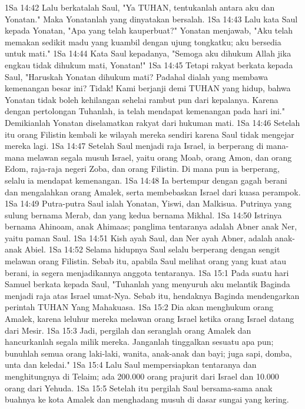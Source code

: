 1Sa 14:42  Lalu berkatalah Saul, "Ya TUHAN, tentukanlah antara aku dan Yonatan." Maka Yonatanlah yang dinyatakan bersalah.
1Sa 14:43  Lalu kata Saul kepada Yonatan, "Apa yang telah kauperbuat?" Yonatan menjawab, "Aku telah memakan sedikit madu yang kuambil dengan ujung tongkatku; aku bersedia untuk mati."
1Sa 14:44  Kata Saul kepadanya, "Semoga aku dihukum Allah jika engkau tidak dihukum mati, Yonatan!"
1Sa 14:45  Tetapi rakyat berkata kepada Saul, "Haruskah Yonatan dihukum mati? Padahal dialah yang membawa kemenangan besar ini? Tidak! Kami berjanji demi TUHAN yang hidup, bahwa Yonatan tidak boleh kehilangan sehelai rambut pun dari kepalanya. Karena dengan pertolongan Tuhanlah, ia telah mendapat kemenangan pada hari ini." Demikianlah Yonatan diselamatkan rakyat dari hukuman mati.
1Sa 14:46  Setelah itu orang Filistin kembali ke wilayah mereka sendiri karena Saul tidak mengejar mereka lagi.
1Sa 14:47  Setelah Saul menjadi raja Israel, ia berperang di mana-mana melawan segala musuh Israel, yaitu orang Moab, orang Amon, dan orang Edom, raja-raja negeri Zoba, dan orang Filistin. Di mana pun ia berperang, selalu ia mendapat kemenangan.
1Sa 14:48  Ia bertempur dengan gagah berani dan mengalahkan orang Amalek, serta membebaskan Israel dari kuasa perampok.
1Sa 14:49  Putra-putra Saul ialah Yonatan, Yiswi, dan Malkisua. Putrinya yang sulung bernama Merab, dan yang kedua bernama Mikhal.
1Sa 14:50  Istrinya bernama Ahinoam, anak Ahimaas; panglima tentaranya adalah Abner anak Ner, yaitu paman Saul.
1Sa 14:51  Kish ayah Saul, dan Ner ayah Abner, adalah anak-anak Abiel.
1Sa 14:52  Selama hidupnya Saul selalu berperang dengan sengit melawan orang Filistin. Sebab itu, apabila Saul melihat orang yang kuat atau berani, ia segera menjadikannya anggota tentaranya.
1Sa 15:1  Pada suatu hari Samuel berkata kepada Saul, "Tuhanlah yang menyuruh aku melantik Baginda menjadi raja atas Israel umat-Nya. Sebab itu, hendaknya Baginda mendengarkan perintah TUHAN Yang Mahakuasa.
1Sa 15:2  Dia akan menghukum orang Amalek, karena leluhur mereka melawan orang Israel ketika orang Israel datang dari Mesir.
1Sa 15:3  Jadi, pergilah dan seranglah orang Amalek dan hancurkanlah segala milik mereka. Janganlah tinggalkan sesuatu apa pun; bunuhlah semua orang laki-laki, wanita, anak-anak dan bayi; juga sapi, domba, unta dan keledai."
1Sa 15:4  Lalu Saul mempersiapkan tentaranya dan menghitungnya di Telaim; ada 200.000 orang prajurit dari Israel dan 10.000 orang dari Yehuda.
1Sa 15:5  Setelah itu pergilah Saul bersama-sama anak buahnya ke kota Amalek dan menghadang musuh di dasar sungai yang kering.
